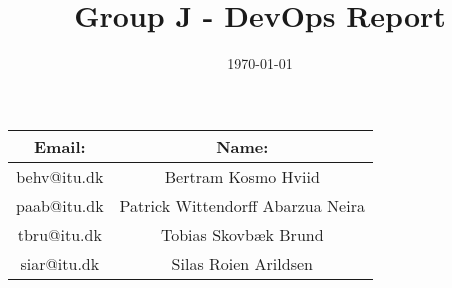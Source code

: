 \documentclass{article}
\title{Group J - DevOps Report}
\author{ }
\date{\today}
\begin{document}
\maketitle
\begin{table}[h]
    \begin{center}
        \begin{tabular*}{1\textwidth}{c  c}
        \toprule
        Email: & Name: \\
        \midrule
        {behv@itu.dk} & {Bertram Kosmo Hviid} \\
        {paab@itu.dk} & {Patrick Wittendorff Abarzua Neira} \\
        {tbru@itu.dk} & {Tobias Skovbæk Brund} \\
        {siar@itu.dk} & {Silas Roien Arildsen} \\
        \bottomrule
        \end{tabular*}
    \end{center}
\end{table}

\newpage
\tableofcontents
\newpage




\newpage
\newpage

\end{document}
